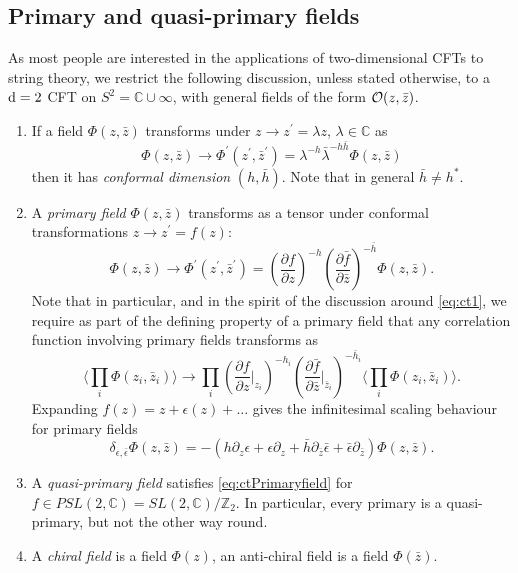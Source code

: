 \subsection{Primary and quasi-primary fields}
As most people are interested in the applications of two-dimensional CFTs to string theory, we restrict the following discussion, unless stated otherwise, to a $\mathrm{d}=2$ CFT on $S^2= \mathbb{C}\cup \infty$, with general fields of the form $\mathcal{O}(z,\bar{ z})$.
\begin{enumerate}
	\item If a field $\Phi(z,\bar{ z})$ transforms under $z\rightarrow z^\prime =\lambda z$, $\lambda \in \mathbb{C}$ as
	\begin{equation}
	\Phi(z,\bar{ z}) \rightarrow \Phi^\prime (z^\prime ,\bar{ z}^\prime) = \lambda^{-h} \bar{\lambda}^{-h\bar{h}} \Phi(z,\bar{z})
	\end{equation}
	then it has \emph{conformal dimension} $(h,\bar{h})$. Note that in general $\bar{h} \neq h^*$.
	\item A \emph{primary field} $\Phi(z,\bar{z})$ transforms as a tensor under conformal transformations $z\rightarrow z^\prime = f(z)$:
	\begin{equation}
	\label{eq:ctPrimaryfield}
	\Phi(z,\bar{z}) \rightarrow \Phi^\prime(z^\prime,\bar{z}^\prime) = \left(\frac{\partial f}{\partial z}\right)^{-h} \left(\frac{\partial \bar{f}}{\partial \bar{z}}\right)^{-\bar{h}} \Phi(z,\bar{z}).
	\end{equation}
	Note that in particular, and in the spirit of the discussion around \ref{eq:ct1}, we require as part of the defining property of a primary field that any correlation function involving primary fields transforms as
	\begin{equation}
	\langle\prod_i \Phi(z_i,\bar{z}_i)\rangle \rightarrow \prod_i \left(\frac{\partial f}{\partial z}|_{z_i}\right)^{-h_i} \left(\frac{\partial \bar{f}}{\partial \bar{z}}|_{\bar{z}_i}\right)^{-\bar{h}_i} \langle \prod_i \Phi(z_i,\bar{z}_i)\rangle.
	\end{equation}
	Expanding $f(z) = z + \epsilon(z)+\dots$ gives the infinitesimal scaling behaviour for primary fields
	\begin{equation}
	\delta_{\epsilon,\bar{\epsilon}} \Phi(z,\bar{z}) = -\left(h \partial_z \epsilon + \epsilon \partial_z +\bar{h} \partial_{\bar{z}} \bar{ \epsilon} + \bar{ \epsilon} \partial_{\bar{z}}\right) \Phi(z,\bar{ z}).
	\end{equation}
	\item A \emph{quasi-primary field} satisfies \ref{eq:ctPrimaryfield} for $f\in PSL(2,\mathbb{C}) = SL(2,\mathbb{C}) /\mathbb{Z}_2$. In particular, every primary is a quasi-primary, but not the other way round.
	
	\item A \emph{chiral field} is a field $\Phi(z)$, an anti-chiral field is a field $\Phi(\bar{ z})$.
\end{enumerate}
